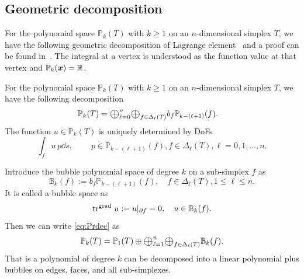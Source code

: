\documentclass[mathpazo]{cicp}
\newcommand{\Oplus}{\ensuremath{\vcenter{\hbox{\scalebox{1.5}{$\oplus$}}}}}
\begin{document}
\subsection{Geometric decomposition}
For the polynomial space $\mathbb P_k(T)$ with $k\geq 1$ on an $n$-dimensional simplex $T$, we have the following geometric decomposition of Lagrange element~\cite[(2.6)]{ArnoldFalkWinther2009} and a proof can be found in~\cite{Chen;Huang:2021Geometric}. The integral at a vertex is understood as the function value at that vertex and $\mathbb P_k({\boldsymbol x}) = \mathbb R$.

\begin{theorem}\label{thm:Lagrangedec}
For the polynomial space $\mathbb P_k(T)$ with $k\geq 1$ on an $n$-dimensional simplex $T$, we have the following decomposition %
\begin{align}
\label{eq:Prdec}
\mathbb P_k(T) &= \Oplus_{\ell = 0}^n\Oplus_{f\in \Delta_{\ell}(T)} b_f\mathbb P_{k - (\ell +1)} (f).
\end{align}
The function $u\in \mathbb P_k(T)$ is uniquely determined by DoFs
\begin{equation}\label{eq:dofPr}
\int_f u \, p \dd s, \quad \quad~p\in \mathbb P_{k - (\ell +1)} (f), f\in \Delta_{\ell}(T), \ell = 0,1,\ldots, n.
\end{equation}
\end{theorem}



Introduce the bubble polynomial space of degree $k$ on a sub-simplex $f$ as
$$
\mathbb B_{k}( f) := b_f\mathbb P_{k - (\ell +1)} (f), \quad f\in \Delta_{\ell}(T), 1\leq \ell \leq n.
$$
It is called a bubble space as
$$
\operatorname{tr}^{{\rm grad\,}} u := u|_{\partial f} = 0, \quad u\in \mathbb B_{k}( f).
$$
Then we can write \eqref{eq:Prdec} as
\begin{equation}\label{eq:Lagdecbubble}
\mathbb P_k(T) = \mathbb P_1(T)\oplus \Oplus_{\ell = 1}^n\Oplus_{f\in \Delta_{\ell}(T)} \mathbb B_{k}( f).
\end{equation}
That is a polynomial of degree $k$ can be decomposed into a linear polynomial plus bubbles on edges, faces, and all sub-simplexes. 
\end{document}
